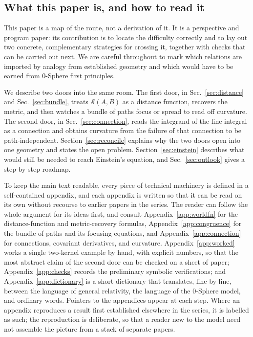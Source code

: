 \documentclass[%
 reprint, amsmath,amssymb, aps, prb, ]{revtex4-2}
\numberwithin{equation}{section}
\begin{document}
\subsection{What this paper is, and how to read it}

This paper is a map of the route, not a derivation of it. It is a perspective and program paper: its contribution is to locate the difficulty correctly and to lay out two concrete, complementary strategies for crossing it, together with checks that can be carried out next. We are careful throughout to mark which relations are imported by analogy from established geometry and which would have to be earned from 0-Sphere first principles.

We describe two doors into the same room. The first door, in Sec.~\ref{sec:distance} and Sec.~\ref{sec:bundle}, treats $\mathcal{S}(A,B)$ as a distance function, recovers the metric, and then watches a bundle of paths focus or spread to read off curvature. The second door, in Sec.~\ref{sec:connection}, reads the integrand of the line integral as a connection and obtains curvature from the failure of that connection to be path-independent. Section~\ref{sec:reconcile} explains why the two doors open into one geometry and states the open problem. Section~\ref{sec:einstein} describes what would still be needed to reach Einstein's equation, and Sec.~\ref{sec:outlook} gives a step-by-step roadmap.

To keep the main text readable, every piece of technical machinery is defined in a self-contained appendix, and each appendix is written so that it can be read on its own without recourse to earlier papers in the series. The reader can follow the whole argument for its ideas first, and consult Appendix~\ref{app:worldfn} for the distance-function and metric-recovery formulas, Appendix~\ref{app:congruence} for the bundle of paths and its focusing equations, and Appendix~\ref{app:connection} for connections, covariant derivatives, and curvature. Appendix~\ref{app:worked} works a single two-kernel example by hand, with explicit numbers, so that the most abstract claim of the second door can be checked on a sheet of paper; Appendix~\ref{app:checks} records the preliminary symbolic verifications; and Appendix~\ref{app:dictionary} is a short dictionary that translates, line by line, between the language of general relativity, the language of the 0-Sphere model, and ordinary words. Pointers to the appendices appear at each step. Where an appendix reproduces a result first established elsewhere in the series, it is labelled as such; the reproduction is deliberate, so that a reader new to the model need not assemble the picture from a stack of separate papers.
\end{document}

